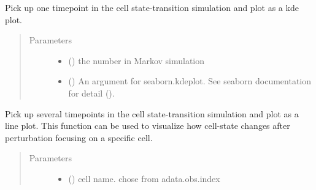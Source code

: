 \documentclass[letterpaper,10pt,english]{sphinxmanual}
\begin{document}
\begin{fulllineitems}
\begin{fulllineitems}
\begin{quote}
\begin{description}
\begin{itemize}
\end{itemize}

\end{description}\end{quote}

\end{fulllineitems}


\begin{fulllineitems}
\label{\detokenize{modules/celloracle:celloracle.Oracle.plot_mc_result_as_kde}}
Pick up one timepoint in the cell state-transition simulation and plot as a kde plot.
\begin{quote}\begin{description}
\item[{Parameters}] \leavevmode\begin{itemize}
\item {} 
 () \textendash{} the number in Markov simulation

\item {} 
 () \textendash{} An argument for seaborn.kdeplot.
See seaborn documentation for detail ().

\end{itemize}

\end{description}\end{quote}

\end{fulllineitems}


\begin{fulllineitems}
\label{\detokenize{modules/celloracle:celloracle.Oracle.plot_mc_result_as_trajectory}}
Pick up several timepoints in the cell state-transition simulation and plot as a line plot.
This function can be used to visualize how cell-state changes after perturbation focusing on a specific cell.
\begin{quote}\begin{description}
\item[{Parameters}] \leavevmode\begin{itemize}
\item {} 
 () \textendash{} cell name. chose from adata.obs.index


\end{itemize}
\end{description}
\end{quote}
\end{fulllineitems}
\end{fulllineitems}
\end{document}
